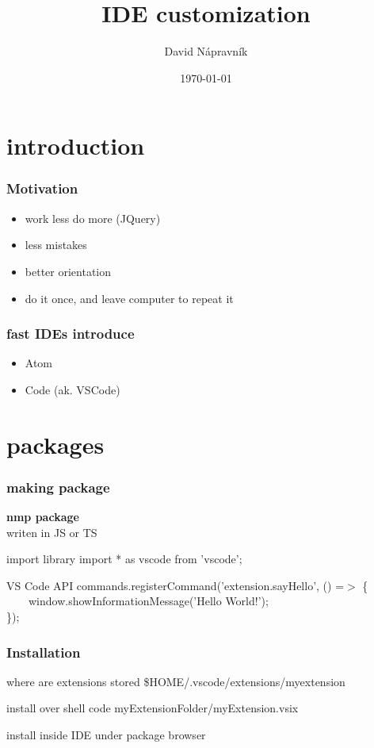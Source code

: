 \documentclass{beamer}
\title[Short title]{IDE customization} %
\author{David Nápravník} %
\institute[mff] %
{
Charles University \\ %
\medskip
\textit{ebrithil@nogare.cz} %
}
\date{\today} %
\begin{document}
\begin{frame}
\titlepage %
\end{frame}


\section{introduction}

\begin{frame}
\frametitle{Motivation}
\begin{itemize}
\item work less do more (JQuery)
\item less mistakes
\item better orientation
\item do it once, and leave computer to repeat it
\end{itemize}
\end{frame}

\begin{frame}
\frametitle{fast IDEs introduce}
\begin{itemize}
\item Atom
\item Code (ak. VSCode)
\end{itemize}
\end{frame}

\section{packages}
\begin{frame}
\frametitle{making package}
\textbf{nmp package}\\
writen in JS or TS
\begin{block}{import library}
import * as vscode from 'vscode';
\end{block}

\begin{block}{VS Code API}
commands.registerCommand('extension.sayHello', () =$>$ \{\\
~~~~window.showInformationMessage('Hello World!');\\
\});
\end{block}
\end{frame}

\begin{frame}
\frametitle{Installation}
\begin{block}{where are extensions stored}
\$HOME/.vscode/extensions/myextension
\end{block}
\begin{block}{install over shell}
code myExtensionFolder/myExtension.vsix
\end{block}
install inside IDE under package browser
\end{frame}
\end{document}
